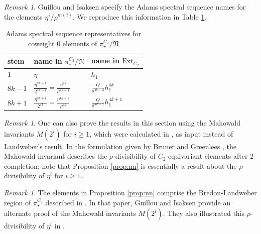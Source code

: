 \documentclass[psamsfonts]{amsart}
\newcommand{\Z}{\mathbb Z}
\newcommand{\fN}{\mathfrak N}
\newcommand{\Ext}{\mathrm {Ext}}
\theoremstyle{definition}
\theoremstyle{remark}
\newtheorem{remark}[theorem]{Remark}
\newcommand{\EvaNote}[1]
   {\marginpar{\raggedright\smaller \smaller \color{Periwinkle}#1}}
\numberwithin{equation}{section}
\begin{document}
\begin{remark}
Guillou and Isaksen \cite{GI} specify the Adams spectral sequence names for
the elements $\eta^i/\rho^{m(i)}$. We reproduce this information in Table \ref{tab:Adams-names}.
\renewcommand{\arraystretch}{2.0}
\begin{table}[H]
\begin{tabular}{@{}l|l|l@{}}
stem &  name in $\pi^{C_2}_\star/\fN$ & name in $\Ext_{C_2}     $                                                                       \\\hline\hline 
1  & $\eta$                         & $h_1 $                                                                                                    \\\hline

$8k-1$ & $\displaystyle\frac{\eta^{8k-1}}{2^{4k-1}}=  \frac{\eta^{4k}}{\rho^{4k-1}}$ & $\displaystyle\frac{Q}{\rho^{4k-2}}h_1^{4k}$   \\[1ex]\hline
$8k+1$ & $\displaystyle\frac{\eta^{8k+1}}{2^{4k}}=\frac{\eta^{4k+1}}{\rho^{4k}}$                                  & $\displaystyle\frac{Q}{\rho^{4k-1}}h_1^{4k+1}$\\
\end{tabular}
\caption{Adams spectral sequence representatives for coweight 0 elements of $\pi_\star^{C_2}/\fN$}
\label{tab:Adams-names}
\end{table}
\end{remark}

\begin{remark}
One can also prove the results in this section using the Mahowald invariants
$M(2^i)$ for $i\geq 1$, which were calculated in \cite{MR}, as input instead of
Landweber's result. In the formulation given by Bruner and Greenlees
\cite{BG}, the Mahowald invariant describes the $\rho$-divisibility of
$C_2$-equivariant elements after $2$-completion; note that Proposition \ref{prop:nn} is essentially a
result about the $\rho$-divisibility of $\eta^i$ for $i\geq 1$.
\end{remark}

\begin{remark}
The elements in Proposition \ref{prop:nn} comprise the Bredon-Landweber region
of $\pi_\star^{C_2}$ described in \cite{GI}. In that paper, Guillou and Isaksen
provide an alternate proof of the Mahowald invariants $M(2^i)$. They also illustrated this $\rho$-divisibility of $\eta^i$ in \cite[Figure 2]{GI}. 
\end{remark}

\end{document}
